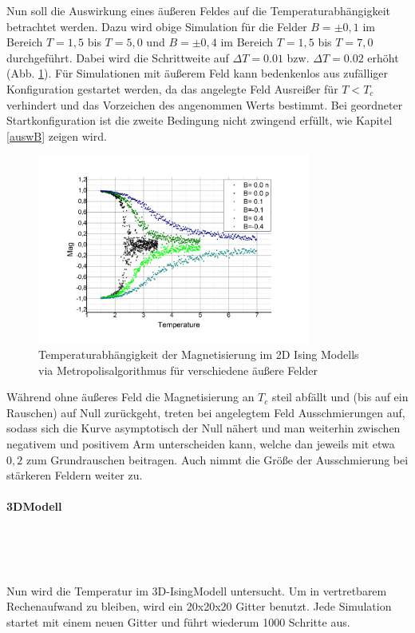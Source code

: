 Nun soll die Auswirkung eines äußeren Feldes auf die Temperaturabhängigkeit betrachtet werden. Dazu wird obige Simulation für die Felder $B=\pm 0,1$ im Bereich $T=1,5$ bis $T=5,0$ und $B=\pm 0,4$ im Bereich $T=1,5$ bis $T=7,0$ durchgeführt. Dabei wird die Schrittweite auf $\Delta T = 0.01$ bzw. $\Delta T = 0.02$ erhöht (Abb. \ref{mp2db}). Für Simulationen mit äußerem Feld kann bedenkenlos aus zufälliger Konfiguration gestartet werden, da das angelegte Feld Ausreißer für $T<T_{c}$ verhindert und das Vorzeichen des angenommen Werts bestimmt. Bei geordneter Startkonfiguration ist die zweite Bedingung nicht zwingend erfüllt, wie Kapitel \ref{auswB} zeigen wird.
\begin{figure}[H]
	\centering
	\includegraphics[width=0.8\textwidth]{../Graph_Export/MP2D/m(T)_MP2D_50_Plot.jpg}	
	\caption{Temperaturabhängigkeit der Magnetisierung im 2D Ising Modells via Metropolisalgorithmus für verschiedene äußere Felder}
	\label{mp2db}
\end{figure}
Während ohne äußeres Feld die Magnetisierung an $T_{c}$ steil abfällt und (bis auf ein Rauschen) auf Null zurückgeht, treten bei angelegtem Feld Ausschmierungen auf, sodass sich die Kurve asymptotisch der Null nähert und man weiterhin zwischen negativem und positivem Arm unterscheiden kann, welche dan jeweils mit etwa $0,2$ zum Grundrauschen beitragen. Auch nimmt die Größe der Ausschmierung bei stärkeren Feldern weiter zu.


\paragraph{3DModell}

\

\

Nun wird die Temperatur im 3D-IsingModell untersucht. Um in vertretbarem Rechenaufwand zu bleiben, wird ein 20x20x20 Gitter benutzt. Jede Simulation startet mit einem neuen Gitter und führt wiederum 1000 Schritte aus.



